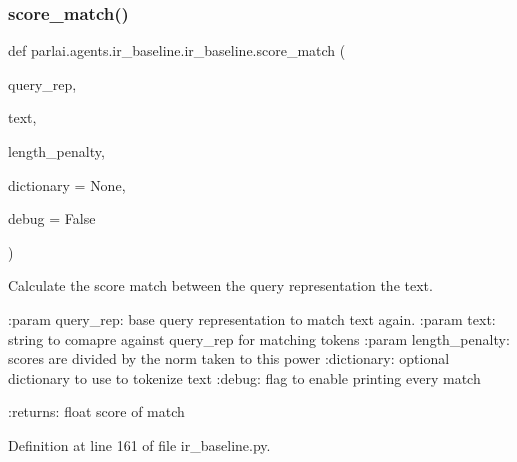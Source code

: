 \subsubsection{\texorpdfstring{score\+\_\+match()}{score\_match()}}
{\footnotesize\ttfamily def parlai.\+agents.\+ir\+\_\+baseline.\+ir\+\_\+baseline.\+score\+\_\+match (\begin{DoxyParamCaption}\item[{}]{query\+\_\+rep,  }\item[{}]{text,  }\item[{}]{length\+\_\+penalty,  }\item[{}]{dictionary = {\ttfamily None},  }\item[{}]{debug = {\ttfamily False} }\end{DoxyParamCaption})}

\begin{DoxyVerb}Calculate the score match between the query representation the text.

:param query_rep: base query representation to match text again.
:param text: string to comapre against query_rep for matching tokens
:param length_penalty: scores are divided by the norm taken to this power
:dictionary: optional dictionary to use to tokenize text
:debug: flag to enable printing every match

:returns: float score of match
\end{DoxyVerb}
 

Definition at line 161 of file ir\+\_\+baseline.\+py.


